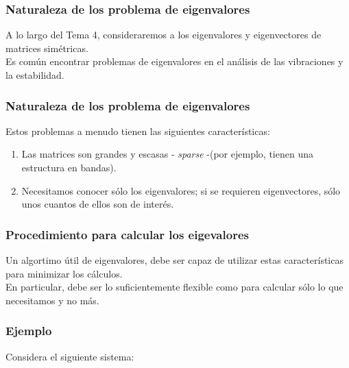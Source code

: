 \documentclass[12pt]{beamer}
\begin{document}
\begin{frame}
\frametitle{Naturaleza de los problema de eigenvalores}
A lo largo del Tema 4, consideraremos a los eigenvalores y eigenvectores de matrices simétricas.
\\
\bigskip
\pause
Es común encontrar problemas de eigenvalores en el análisis de las vibraciones y la estabilidad.
\end{frame}
\begin{frame}
\frametitle{Naturaleza de los problema de eigenvalores}
Estos problemas a menudo tienen las siguientes características:
\begin{enumerate}[<+->]
\item Las matrices son grandes y escasas - \emph{sparse} -(por ejemplo, tienen una estructura en bandas).
\item Necesitamos conocer sólo los eigenvalores; si se requieren eigenvectores, sólo unos cuantos de ellos son de interés.
\end{enumerate}
\end{frame}
\begin{frame}
\frametitle{Procedimiento para calcular los eigevalores}
Un algortimo útil de eigenvalores, debe ser capaz de utilizar estas características para minimizar los cálculos.
\\
\bigskip
\pause
En particular, debe ser lo suficientemente flexible como para calcular sólo lo que necesitamos y no más.
\end{frame}
\begin{frame}
\frametitle{Ejemplo}
Considera el siguiente sistema:
\\
\bigskip
\pause
\begin{figure}
\end{figure}
\end{frame}
\end{document}
